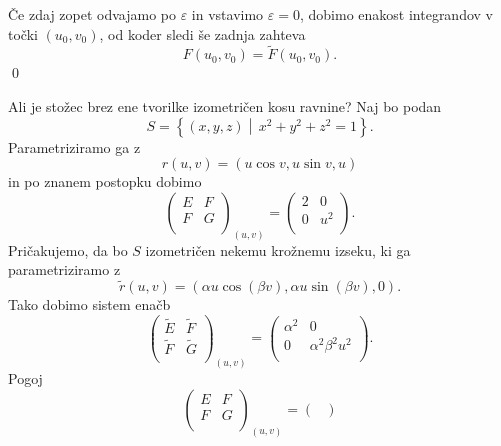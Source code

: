 Če zdaj zopet odvajamo po $\varepsilon$ in vstavimo $\varepsilon = 0$, dobimo enakost integrandov v točki $(u_0, v_0)$, od koder sledi še zadnja zahteva
\begin{equation*} F(u_0, v_0) = \tilde{F}(u_0, v_0). \end{equation*}
\qed

\begin{primer}
 Ali je stožec brez ene tvorilke izometričen kosu ravnine? Naj bo podan 
 \begin{equation*} S = \left\{ (x,y,z)  \middle|\, x^2 + y^2 + z^2 = 1 \right\}.\end{equation*}
 Parametriziramo ga z
 \begin{equation*} r(u,v) = (u \cos v, u \sin v, u) \end{equation*}in po znanem postopku dobimo 
 \begin{equation*} \begin{pmatrix}
  E & F\\
  F & G\\
 \end{pmatrix}_{(u,v)} 
 = \begin{pmatrix}
  2 & 0\\
  0 & u^2\\
 \end{pmatrix}.\end{equation*}
Pričakujemo, da bo $S$ izometričen nekemu krožnemu izseku, ki ga parametriziramo z 
\begin{equation*} \tilde{r}(u,v) = (\alpha u \cos(\beta v), \alpha u \sin(\beta v), 0).\end{equation*}Tako dobimo sistem enačb 
\begin{equation*} \begin{pmatrix}
  \tilde{E} & \tilde{F}\\
  \tilde{F} & \tilde{G}\\
 \end{pmatrix}_{(u,v)} 
 = \begin{pmatrix}
  \alpha^2 & 0\\
  0 & \alpha^2 \beta^2 u^2\\
 \end{pmatrix}.\end{equation*}
Pogoj  \begin{equation*} \begin{pmatrix}
  E & F\\
  F & G\\
 \end{pmatrix}_{(u,v)}
 = \begin{pmatrix}

\end{pmatrix}
\end{equation*}
\end{primer}

